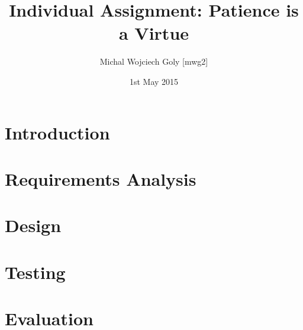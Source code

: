 \documentclass[a4paper, 12pt, titlepage]{article}
\title{Individual Assignment: Patience is a Virtue}
\author{Michal Wojciech Goly [mwg2]}
\date{1st May 2015}
\begin{document}
\maketitle
\tableofcontents

\section{Introduction}

\section{Requirements Analysis}

\section{Design}

\section{Testing}

\section{Evaluation}
\end{document}
